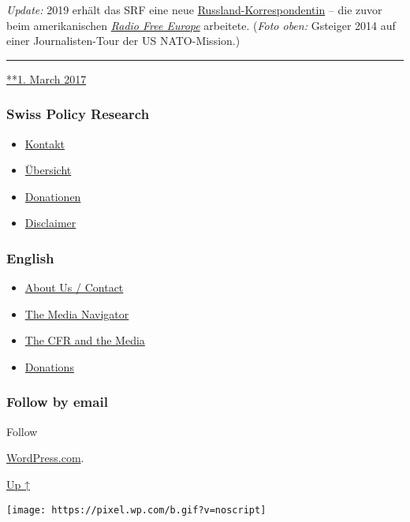 \emph{Update:} 2019 erhält das SRF eine neue
\href{https://www.srgd.ch/de/aktuelles/news/2017/12/05/luzia-tschirky-wird-neue-russland-korrespondentin/}{Russland-Korrespondentin}
-- die zuvor beim amerikanischen
\href{https://de.wikipedia.org/wiki/Radio_Free_Europe}{\emph{Radio Free
Europe}} arbeitete. (\emph{Foto oben:} Gsteiger 2014 auf einer
Jour­na­­listen-​Tour der US NATO-Mission.)

\begin{center}\rule{0.5\linewidth}{\linethickness}\end{center}

\href{https://swprs.org/2017/03/01/der-korrespondent/}{**1. March 2017}

\hypertarget{swiss-policy-research}{%
\subsubsection{Swiss Policy Research}\label{swiss-policy-research}}

\begin{itemize}
\tightlist
\item
  \href{https://swprs.org/kontakt/}{Kontakt}
\item
  \href{https://swprs.org/uebersicht/}{Übersicht}
\item
  \href{https://swprs.org/donationen/}{Donationen}
\item
  \href{https://swprs.org/disclaimer/}{Disclaimer}
\end{itemize}

\hypertarget{english}{%
\subsubsection{English}\label{english}}

\begin{itemize}
\tightlist
\item
  \href{https://swprs.org/contact/}{About Us / Contact}
\item
  \href{https://swprs.org/media-navigator/}{The Media Navigator}
\item
  \href{https://swprs.org/the-american-empire-and-its-media/}{The CFR
  and the Media}
\item
  \href{https://swprs.org/donations/}{Donations}
\end{itemize}

\hypertarget{follow-by-email}{%
\subsubsection{Follow by email}\label{follow-by-email}}

Follow

\href{https://wordpress.com/?ref=footer_custom_com}{WordPress.com}.

\protect\hyperlink{}{Up ↑}

\texttt{[image: https://pixel.wp.com/b.gif?v=noscript]}
